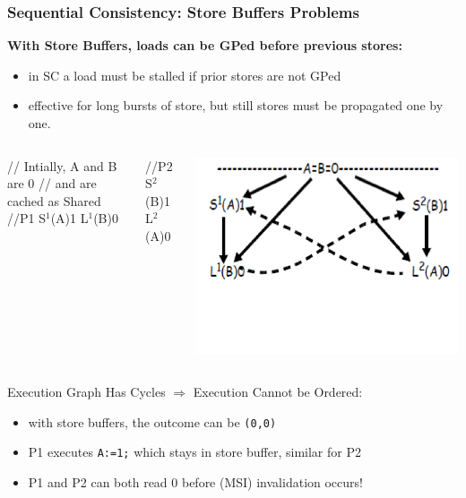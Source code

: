 \documentclass{beamer}
\renewcommand{\emph}[1]{\textcolor{structure}{#1}}
\newcommand{\emp}[1]{\textcolor{DikuRed}{ #1}}
\newcommand{\mymath}[1]{$ #1 $}
\newcommand{\myindu}[1]{^{#1}}
\begin{document}
\begin{frame}[fragile,t]
\frametitle{Sequential Consistency: Store Buffers Problems}

\emp{\bf With Store Buffers, loads can be GPed before previous stores:}
\begin{itemize}
    \item in SC a load must be stalled if prior stores are not GPed
    \item \emph{effective for long bursts of store}, but still stores must
                be propagated one by one.
\end{itemize}
\bigskip

\begin{columns}
\vspace{-10ex}
\begin{colorcode}[fontsize=\scriptsize]
// Intially, A and B are 0 
// and are cached as Shared 
//P1
S\mymath{\myindu{1}}(A)1
L\mymath{\myindu{1}}(B)0
\end{colorcode} 
\vspace{-10ex}
\begin{colorcode}[fontsize=\scriptsize]


//P2
S\mymath{\myindu{2}}(B)1
L\mymath{\myindu{2}}(A)0
\end{colorcode} 
\includegraphics[width=39ex]{Ch7Figs/SeqConsGraphEg}
\end{columns}
\vspace{-8ex}

\alert{Execution Graph Has Cycles $\Rightarrow$ Execution Cannot be Ordered}:
\begin{itemize}
    \item with store buffers, the outcome can be {\tt (0,0)}
    \item P1 executes {\tt A:=1;} which stays in store buffer, similar for P2
    \item \alert{P1 and P2 can both read 0 before (MSI) invalidation occurs!}
\end{itemize}


\end{frame}
\end{document}
